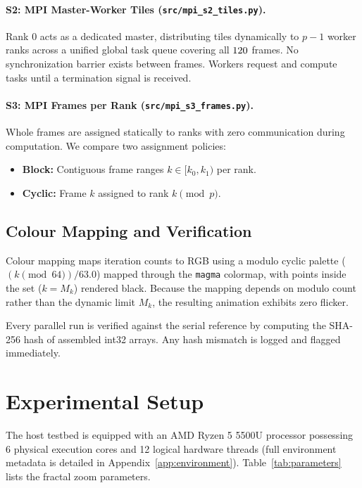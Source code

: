 \documentclass[11pt,a4paper]{article}
\begin{document}
\paragraph{S2: MPI Master-Worker Tiles (\texttt{src/mpi\_s2\_tiles.py}).} Rank 0 acts as a dedicated master, distributing tiles dynamically to $p - 1$ worker ranks across a unified global task queue covering all $120$ frames. No synchronization barrier exists between frames. Workers request and compute tasks until a termination signal is received.

\paragraph{S3: MPI Frames per Rank (\texttt{src/mpi\_s3\_frames.py}).} Whole frames are assigned statically to ranks with zero communication during computation. We compare two assignment policies:
\begin{itemize}
    \item \textbf{Block:} Contiguous frame ranges $k \in [k_0, k_1)$ per rank.
    \item \textbf{Cyclic:} Frame $k$ assigned to rank $k \pmod p$.
\end{itemize}

\subsection{Colour Mapping and Verification}
Colour mapping maps iteration counts to RGB using a modulo cyclic palette ($(k \pmod{64})/63.0$) mapped through the \texttt{magma} colormap, with points inside the set ($k = M_k$) rendered black. Because the mapping depends on modulo count rather than the dynamic limit $M_k$, the resulting animation exhibits zero flicker.

Every parallel run is verified against the serial reference by computing the SHA-256 hash of assembled int32 arrays. Any hash mismatch is logged and flagged immediately.

\section{Experimental Setup}
\label{sec:setup}

The host testbed is equipped with an AMD Ryzen 5 5500U processor possessing 6 physical execution cores and 12 logical hardware threads (full environment metadata is detailed in Appendix~\ref{app:environment}). Table~\ref{tab:parameters} lists the fractal zoom parameters.
\end{document}
